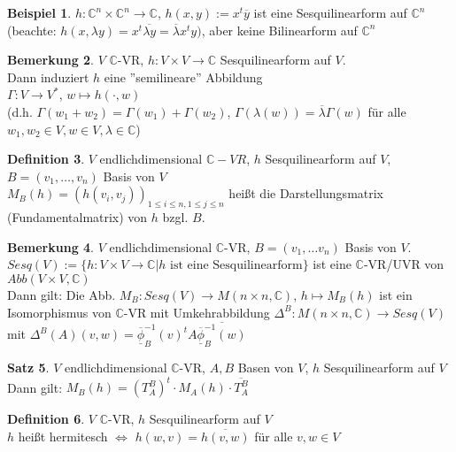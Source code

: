 \documentclass[10pt,a4paper,numbers=endperiod]{scrartcl}
\theoremstyle{definition}
\newtheorem{satz}{Satz}[section]
\newtheorem{defi}[satz]{Definition}
\newtheorem{bem}[satz]{Bemerkung}
\newtheorem{bsp}[satz]{Beispiel}
\def\CC{{\mathbb C}}
\begin{document}
\begin{bsp}
	$h: \CC^n \times \CC^n \rightarrow \CC$, $h(x,y) := x^t \overline{y}$ ist eine Sesquilinearform auf $\CC^n$\\
	(beachte: $h(x, \lambda y) = x^t \overline{\lambda y} = \overline{\lambda} x^t y)$, aber keine Bilinearform auf $\CC^n$
\end{bsp}

\begin{bem}
	$V$ $\CC$-VR, $h: V \times V \rightarrow \CC$ Sesquilinearform auf $V$.\\
	Dann induziert $h$ eine ''semilineare'' Abbildung\\
	$\Gamma : V \rightarrow V^*$, $w \mapsto h(\cdot, w)$\\
	(d.h. $\Gamma(w_1 + w_2) = \Gamma(w_1) + \Gamma(w_2)$, $\Gamma(\lambda(w)) = \overline{\lambda} \Gamma(w)$ für alle $w_1, w_2 \in V, w \in V, \lambda \in \CC$)
\end{bem}

\begin{defi}
	$V$ endlichdimensional $\CC-VR$, $h$ Sesquilinearform auf $V$, $B = (v_1, \ldots, v_n)$ Basis von $V$\\
	$M_B(h) = (h(v_i, v_j))_{1 \leq i \leq n, 1 \leq j \leq n}$ heißt die Darstellungsmatrix (Fundamentalmatrix) von $h$ bzgl. $B$. 
\end{defi}

\begin{bem}
	$V$ endlichdimensional $\CC$-VR, $B = (v_1, \ldots v_n)$ Basis von $V$.\\
	$Sesq(V) := \{h: V \times V \rightarrow \CC| h \text{ ist eine Sesquilinearform}\}$ ist eine $\CC$-VR/UVR von $Abb(V \times V, \CC)$\\
	Dann gilt: Die Abb. $M_B: Sesq(V) \rightarrow M(n \times n, \CC)$, $h \mapsto M_B(h)$ ist ein Isomorphismus von $\CC$-VR mit Umkehrabbildung $\varDelta^B: M(n \times n, \CC) \rightarrow Sesq(V)$ mit $\varDelta^B(A)(v,w) = \overline{\underline{\phi}}_B^{-1} (v)^t A \overline{\overline{\underline{\phi}}_B^{-1} (w)}$
\end{bem}

\begin{satz}
	$V$ endlichdimensional $\CC$-VR, $A, B$ Basen von $V$, $h$ Sesquilinearform auf $V$\\
	Dann gilt: $M_B(h) = (T_A^B)^t \cdot M_A(h) \cdot \overline{T_A^B}$
\end{satz}

\begin{defi}
	$V$ $\CC$-VR, $h$ Sesquilinearform auf $V$\\
	$h$ heißt hermitesch $\Leftrightarrow$ $h(w,v) = \overline{h(v,w)}$ für alle $v,w \in V$
\end{defi}
\end{document}
